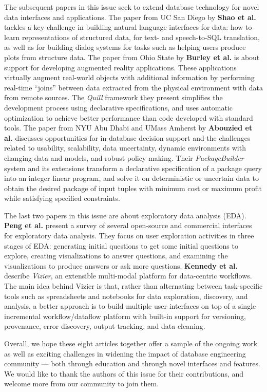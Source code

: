 \documentclass[11pt]{article}
\begin{document}
The subsequent papers in this issue seek to extend database technology for novel data interfaces and applications. The paper from UC San Diego by \textbf{Shao et al.} tackles a key challenge in building natural language interfaces for data: how to learn representations of structured data, for text- and speech-to-SQL translation, as well as for building dialog systems for tasks such as helping users produce plots from structure data. The paper from Ohio State by \textbf{Burley et al.} is about support for developing augmented reality applications. These applications virtually augment real-world objects with additional information by performing real-time ``joins'' between data extracted from the physical environment with data from remote sources. The \emph{Quill} framework they present simplifies the development process using declarative specifications, and uses automatic optimization to achieve better performance than code developed with standard tools. The paper from NYU Abu Dhabi and UMass Amherst by \textbf{Abouzied et al.} discusses opportunities for in-database decision support and the challenges related to usability, scalability, data uncertainty, dynamic environments with changing data and models, and robust policy making. Their \emph{PackageBuilder} system and its extensions transform a declarative specification of a package query into an integer linear program, and solve it on deterministic or uncertain data to obtain the desired package of input tuples with minimum cost or maximum profit while satisfying specified constraints.   

The last two papers in this issue are about exploratory data analysis (EDA). \textbf{Peng et al.} present a survey of several open-source and commercial interfaces for exploratory data analysis. They focus on user exploration activities in three stages of EDA: generating initial questions to get some initial questions to explore,  creating visualizations to answer questions, and examining the visualizations to produce answers or ask more  questions. \textbf{Kennedy et al.} describe \emph{Vizier}, an extensible multi-modal platform for data-centric workflows. The main idea behind Vizier is that, rather than alternating between task-specific tools such as spreadsheets and notebooks for data exploration, discovery, and analysis, a better approach is to build multiple user interfaces on top of a single incremental workflow/dataflow platform with built-in support for versioning, provenance, error discovery, output  tracking, and data cleaning.

Overall, we hope these eight articles together offer a sample of the ongoing work as well as exciting challenges in widening the impact of database engineering community --- both through education and through novel interfaces and features.
We would like to thank the authors of this issue for their contributions, and welcome more from our community to join them.
\end{document}

